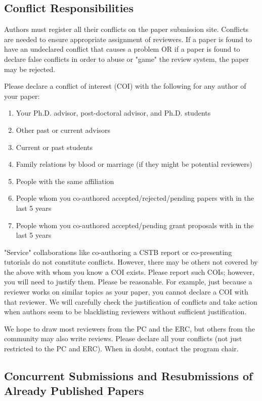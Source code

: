 \documentclass[pageno]{jpaper}
\begin{document}
\subsection{Conflict Responsibilities}

Authors must register all their conflicts on the paper submission site. 
Conflicts are needed to ensure appropriate assignment of reviewers. If a paper
is found to have an undeclared conflict that causes a problem OR if a paper 
is found to declare false conflicts in order to abuse or "game" the review 
system, the paper may be rejected. 
 
Please declare a conflict of interest (COI) with the following for any author of your paper:

\begin{enumerate}
\item Your Ph.D. advisor, post-doctoral advisor, and Ph.D. students
\item Other past or current advisors
\item Current or past students
\item Family relations by blood or marriage (if they might be potential reviewers)
\item People with the same affiliation
\item People whom you co-authored accepted/rejected/pending papers with in the last 5 years
\item People whom you co-authored accepted/pending grant proposals with in the last 5 years
\end{enumerate}

"Service" collaborations like co-authoring a CSTB report or co-presenting tutorials do 
not constitute conflicts. However, there may be others not covered 
by the above with whom you know a COI exists. Please report such COIs; however, you 
will need to justify them. Please be reasonable. For example, just because a reviewer
works on similar topics as your paper, you cannot declare a COI with that reviewer. We
will carefully check the justification of conflicts and take action when authors seem to be 
blacklisting reviewers without sufficient justification. 

We hope to draw most reviewers 
from the PC and the ERC, but others from the community may also write reviews. Please
declare all your conflicts (not just restricted to the PC and ERC). When in doubt, 
contact the program chair.


\subsection{Concurrent Submissions and Resubmissions of Already Published Papers}
\end{document}
